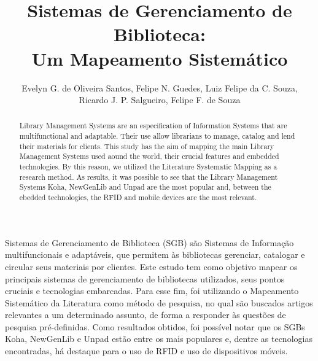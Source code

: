 \documentclass[12pt]{article}
\title{Sistemas de Gerenciamento de Biblioteca:\\ Um Mapeamento Sistemático}
\author{Evelyn G. de Oliveira Santos\inst{1}, Felipe N. Guedes\inst{1}, Luiz Felipe da C. Souza\inst{1},\\ Ricardo J. P. Salgueiro\inst{1}, Felipe F. de Souza\inst{1}}
\begin{document}
 

\maketitle
\begin{abstract}
  Library Management Systems are an especification of Information Systems that are multifunctional and adaptable. Their use allow librarians to manage, catalog and lend their materials for clients. This study has the aim of mapping the main Library Management Systems used aound the world, their crucial features and embedded technologies. By this reason, we utilized the Literature Systematic Mapping as a research method. As results, it was possible to see that the Library Management Systems Koha, NewGenLib and Unpad are the most popular and, between the ebedded technologies, the RFID and mobile devices are the most relevant. 
\end{abstract}
     
\begin{resumo} 
  Sistemas de Gerenciamento de Biblioteca (SGB) são Sistemas de Informação multifuncionais e adaptáveis, que permitem às bibliotecas gerenciar, catalogar e circular seus materiais por clientes. Este estudo tem como objetivo mapear os principais sistemas de gerenciamento de bibliotecas utilizados, seus pontos cruciais e tecnologias embarcadas. Para esse fim, foi utilizando o Mapeamento Sistemático da Literatura como método de pesquisa, no qual são buscados artigos relevantes a um determinado assunto, de forma a responder às questões de pesquisa pré-definidas. Como resultados obtidos, foi possível notar que os SGBs Koha, NewGenLib e Unpad estão entre os mais populares e, dentre as tecnologias encontradas, há destaque para o uso de RFID e uso de dispositivos móveis.
\end{resumo}
\end{document}
